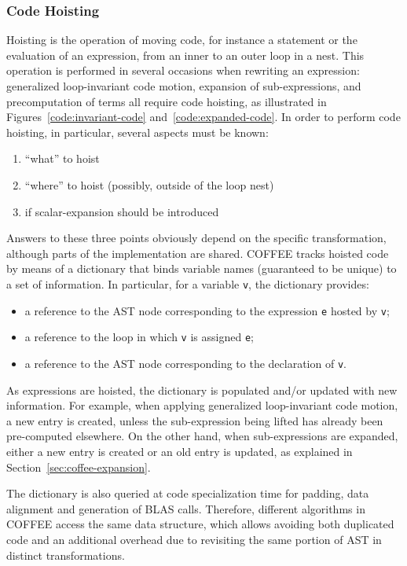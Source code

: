 \subsubsection{Code Hoisting}
Hoisting is the operation of moving code, for instance a statement or the evaluation of an expression, from an inner to an outer loop in a nest. This operation is performed in several occasions when rewriting an expression: generalized loop-invariant code motion, expansion of sub-expressions, and precomputation of terms all require code hoisting, as illustrated in Figures~\ref{code:invariant-code} and~\ref{code:expanded-code}. In order to perform code hoisting, in particular, several aspects must be known:
\begin{enumerate}
\item ``what'' to hoist
\item ``where'' to hoist (possibly, outside of the loop nest)
\item if scalar-expansion should be introduced
\end{enumerate}
Answers to these three points obviously depend on the specific transformation, although parts of the implementation are shared. COFFEE tracks hoisted code by means of a dictionary that binds variable names (guaranteed to be unique) to a set of information. In particular, for a variable \texttt{v}, the dictionary provides:
\begin{itemize}
\item a reference to the AST node corresponding to the expression \texttt{e} hosted by \texttt{v};
\item a reference to the loop in which \texttt{v} is assigned \texttt{e};
\item a reference to the AST node corresponding to the declaration of \texttt{v}.
\end{itemize}
As expressions are hoisted, the dictionary is populated and/or updated with new information. For example, when applying generalized loop-invariant code motion, a new entry is created, unless the sub-expression being lifted has already been pre-computed elsewhere. On the other hand, when sub-expressions are expanded, either a new entry is created or an old entry is updated, as explained in Section~\ref{sec:coffee-expansion}. 

The dictionary is also queried at code specialization time for padding, data alignment and generation of BLAS calls. Therefore, different algorithms in COFFEE access the same data structure, which allows avoiding both duplicated code and an additional overhead due to revisiting the same portion of AST in distinct transformations.

